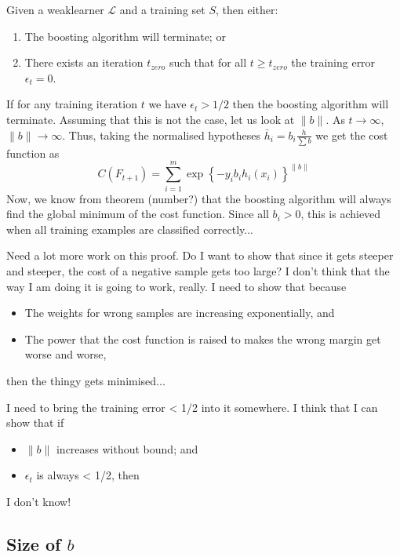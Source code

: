 \begin{theorem}
Given a weaklearner $\mathcal{L}$ and a training set $S$,
then either:
\begin{enumerate}
\item	The boosting algorithm will terminate; or
\item	There exists an iteration $t_{zero}$ such that for all $t \geq
	t_{zero}$ the training error $\epsilon_t = 0$.
\end{enumerate}

\proof If for any training iteration $t$ we have $\epsilon_t > 1/2$ then the
boosting algorithm will terminate.  Assuming that this is not the
case, let us look at $\|b\|$.  As $t \rightarrow \infty$, $\|b\|
\rightarrow \infty$.  Thus, taking the normalised hypotheses $\bar{h}_i
= b_i \frac{h}{\sum b}$ we get the cost function as
\[
C(F_{t+1}) = \sum_{i=1}^{m} \exp\left\{ -y_i b_i h_i(x_i)
\right\}^{\|b\|}
\]
Now, we know from theorem (number?) that the boosting algorithm will
always find the global minimum of the cost function.  Since all $b_i >
0$, this is achieved when all training examples are classified
correctly...

Need a lot more work on this proof.  Do I want to show that since it
gets steeper and steeper, the cost of a negative sample gets too
large?  I don't think that the way I am doing it is going to work,
really.  I need to show that because
\begin{itemize}
\item	The weights for wrong samples are increasing exponentially,
	and
\item	The power that the cost function is raised to makes the wrong
	margin get worse and worse,
\end{itemize}
then the thingy gets minimised...

I need to bring the training error < 1/2 into it somewhere.  I think
that I can show that if
\begin{itemize}
\item	$\|b\|$ increases without bound; and
\item	$\epsilon_t$ is always < 1/2, then
\end{itemize}
I don't know!

\end{theorem}



\subsection{Size of $b$}

